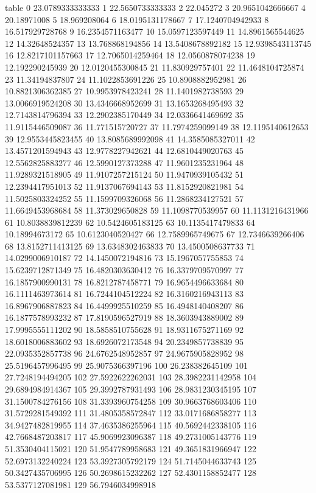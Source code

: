 table {%
0 23.0789333333333
1 22.5650733333333
2 22.045272
3 20.9651042666667
4 20.18971008
5 18.969208064
6 18.0195131178667
7 17.1240704942933
8 16.517929728768
9 16.2354571163477
10 15.0597123597449
11 14.8961565544625
12 14.32648524357
13 13.768868194856
14 13.5408678892182
15 12.9398543113745
16 12.8217101157663
17 12.7065014259464
18 12.0560878074238
19 12.192290245939
20 12.0120455300845
21 11.830929757401
22 11.4648104725874
23 11.34194837807
24 11.1022853691226
25 10.8908882952981
26 10.8821306362385
27 10.9953978423241
28 11.1401982738593
29 13.0066919524208
30 13.4346668952699
31 13.1653268495493
32 12.7143814796394
33 12.2902385170449
34 12.0336641469692
35 11.9115446509087
36 11.771515720727
37 11.7974259099149
38 12.1195140612653
39 12.9553445823455
40 13.8085689992098
41 14.3585085327011
42 13.4571201594943
43 12.9778227942621
44 12.6810449020763
45 12.5562825883277
46 12.5990127373288
47 11.9601235231964
48 11.9289321518905
49 11.9107257215124
50 11.9470939105432
51 12.2394417951013
52 11.9137067694143
53 11.8152920821981
54 11.5025803324252
55 11.1599709326068
56 11.2868234127521
57 11.6649453968684
58 11.373029650828
59 11.1098770539957
60 11.1131216431966
61 10.8038839812239
62 10.5424605183125
63 10.1135417479833
64 10.18994673172
65 10.6123040520427
66 12.7589965749675
67 12.7346639266406
68 13.8152711413125
69 13.6348302463833
70 13.4500508637733
71 14.0299006910187
72 14.1450072194816
73 15.1967057755853
74 15.6239712871349
75 16.4820303630412
76 16.3379709570997
77 16.1857900990131
78 16.8212787458771
79 16.9654496633684
80 16.1111463973614
81 16.7244104512224
82 16.3160216943113
83 16.8967906887823
84 16.4499925510259
85 16.4948140408207
86 16.1877578993232
87 17.8190596527919
88 18.3603943889002
89 17.9995555111202
90 18.5858510755628
91 18.9311675271169
92 18.6018006883602
93 18.6926072173548
94 20.2349857738839
95 22.0935352857738
96 24.6762548952857
97 24.9675905828952
98 25.5196457996495
99 25.9075366397196
100 26.238382645109
101 27.7248194494205
102 27.5922622262031
103 28.3982231142958
104 29.6894984914367
105 29.3992787931493
106 28.9831230345195
107 31.1500784276156
108 31.3393960754258
109 30.9663768603406
110 31.5729281549392
111 31.4805358572847
112 33.0171686858277
113 34.9427482819955
114 37.4635386255964
115 40.5692442338105
116 42.7668487203817
117 45.9069923096387
118 49.2731005143776
119 51.3530404115021
120 51.9547789958683
121 49.3651831966947
122 52.6973132240224
123 53.3927305792179
124 51.7145044633743
125 50.3427435706995
126 50.2698615232262
127 52.4301158852477
128 53.5377127081981
129 56.7946034998918
}
